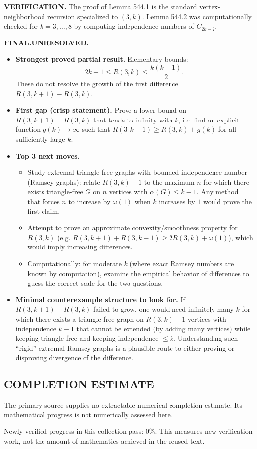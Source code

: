 \noindent\textbf{VERIFICATION.}
The proof of Lemma 544.1 is the standard vertex-neighborhood recursion specialized to $(3,k)$.
Lemma 544.2 was computationally checked for $k=3,\dots,8$ by computing independence numbers of $C_{2k-2}$.

\noindent\textbf{FINAL.}\;\textbf{UNRESOLVED.}
\begin{itemize}
\item[(i)] \textbf{Strongest proved partial result.} Elementary bounds:
\[2k-1\le R(3,k)\le \frac{k(k+1)}{2}.
\]
These do not resolve the growth of the first difference $R(3,k+1)-R(3,k)$.
\item[(ii)] \textbf{First gap (crisp statement).} Prove a lower bound on $R(3,k+1)-R(3,k)$ that tends to infinity with $k$, i.e. find an explicit function $g(k)\to\infty$ such that $R(3,k+1)\ge R(3,k)+g(k)$ for all sufficiently large $k$.
\item[(iii)] \textbf{Top 3 next moves.}
  \begin{itemize}
  \item Study extremal triangle-free graphs with bounded independence number (Ramsey graphs): relate $R(3,k)-1$ to the maximum $n$ for which there exists triangle-free $G$ on $n$ vertices with $\alpha(G)\le k-1$. Any method that forces $n$ to increase by $\omega(1)$ when $k$ increases by $1$ would prove the first claim.
  \item Attempt to prove an approximate convexity/smoothness property for $R(3,k)$ (e.g. $R(3,k+1)+R(3,k-1)\ge 2R(3,k)+\omega(1)$), which would imply increasing differences.
  \item Computationally: for moderate $k$ (where exact Ramsey numbers are known by computation), examine the empirical behavior of differences to guess the correct scale for the two questions.
  \end{itemize}
\item[(iv)] \textbf{Minimal counterexample structure to look for.} If $R(3,k+1)-R(3,k)$ failed to grow, one would need infinitely many $k$ for which there exists a triangle-free graph on $R(3,k)-1$ vertices with independence $k-1$ that cannot be extended (by adding many vertices) while keeping triangle-free and keeping independence $\le k$. Understanding such ``rigid'' extremal Ramsey graphs is a plausible route to either proving or disproving divergence of the difference.
\end{itemize}



\subsection*{COMPLETION ESTIMATE}
The primary source supplies no extractable numerical completion estimate. Its mathematical progress is not numerically assessed here.

Newly verified progress in this collection pass: $0\%$. This measures new verification work, not the amount of mathematics achieved in the reused text.
